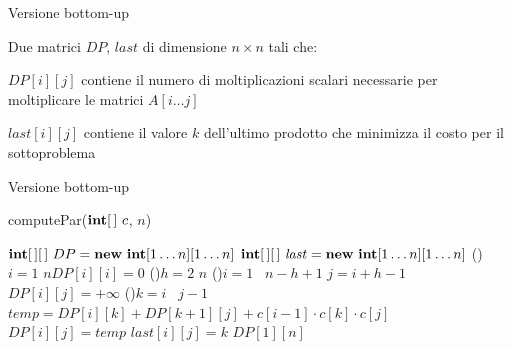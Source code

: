 \begin{frame}{Versione bottom-up}

\vspace{-9pt}
\begin{myboxtitle}
Due matrici $DP$, $\mathit{last}$ di dimensione $n \times n$ tali che:
\BIL
\item $DP[i][j]$ contiene il numero di moltiplicazioni scalari necessarie
per moltiplicare le matrici $A[i \ldots j]$
\item $\mathit{last}[i][j]$ contiene il valore $k$ dell'ultimo prodotto che minimizza il costo per il sottoproblema
\EIL
\end{myboxtitle}
\end{frame}

\begin{frame}[shrink=10]{Versione bottom-up}

\vspace{-9pt}
\begin{Procedure}
\caption[A]{\textsf{computePar}($\INTARRAY\ c$, \INTEGER $n$)}	
$\INTARRAY[\,]\ DP = \NEW\ \INTEGER[1 \ldots n][1 \ldots n]$\;
$\INTARRAY[\,]\ \mathit{last} = \NEW\ \INTEGER[1 \ldots n][1 \ldots n]$\;
\For(){$i = 1$ \TO $n$}{$DP[i][i] = 0$\;}
\For(){$h = 2$ \TO $n$}
{
  \For(){$i = 1$ \TO\ $n-h+1$}
  {
    \INTEGER $j = i+h-1$
    $DP[i][j] = +\infty$\;
    \For(){$k = i$ \TO\ $j-1$} 
    {
      \INTEGER\ $\mathit{temp} = DP[i][k] + DP[k+1][j] + c[i-1] \cdot c[k] \cdot c[j]$\;
      {
        $DP[i][j] = \mathit{temp}$\;
        $\mathit{last}[i][j] = k$\;
      }
    }
  }
}
\Return $DP[1][n]$\;
\end{Procedure}

\end{frame}


